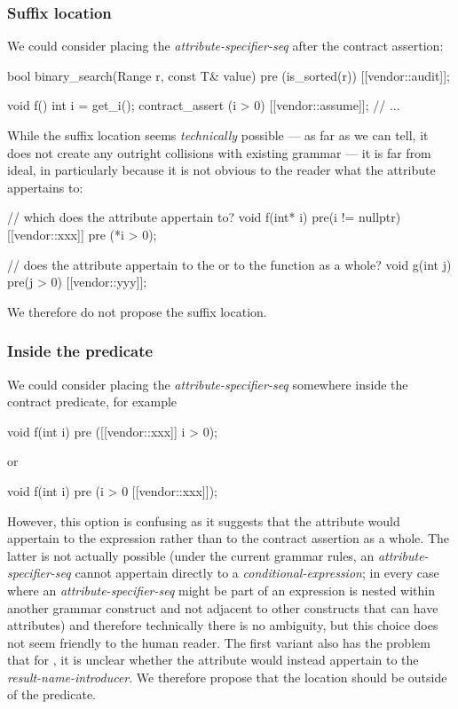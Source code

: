 \subsubsection{Suffix location}
We could consider placing the \emph{attribute-specifier-seq} after the contract assertion:
\begin{codeblock}
bool binary_search(Range r, const T& value)
  pre (is_sorted(r)) [[vendor::audit]];
  
void f() {
  int i = get_i();
  contract_assert (i > 0) [[vendor::assume]];
  // ...
}
\end{codeblock}
While the suffix location seems \emph{technically} possible --- as far as we can tell, it does not create any outright collisions with existing grammar --- it is far from ideal, in particularly because it is not obvious to the reader what the attribute appertains to:
\begin{codeblock}
// which  does the attribute appertain to?
void f(int* i)
  pre(i != nullptr) [[vendor::xxx]] pre (*i > 0);  

// does the attribute appertain to the  or to the function  as a whole?
void g(int j) pre(j > 0) [[vendor::yyy]]; 
\end{codeblock}

We therefore do not propose the suffix location.

\subsubsection{Inside the predicate}

We could consider placing the  \emph{attribute-specifier-seq} somewhere inside the contract predicate, for example
\begin{codeblock}
void f(int i) 
  pre ([[vendor::xxx]] i > 0);
\end{codeblock}
or
\begin{codeblock}
void f(int i) 
  pre (i > 0 [[vendor::xxx]]);
\end{codeblock}
However, this option is confusing as it suggests that the attribute would appertain to the expression rather than to the contract assertion as a whole. The latter is not actually possible (under the current grammar rules, an \emph{attribute-specifier-seq} cannot appertain directly to a \emph{conditional-expression}; in every case where an \emph{attribute-specifier-seq} might be part of an expression is nested within another grammar construct and not adjacent to other constructs that can have attributes) and therefore technically there is no ambiguity, but this choice does not seem friendly to the human reader. The  first variant also has the problem that for , it is unclear whether the attribute would instead appertain to the \emph{result-name-introducer}. We therefore propose that the location should be outside of the predicate.

